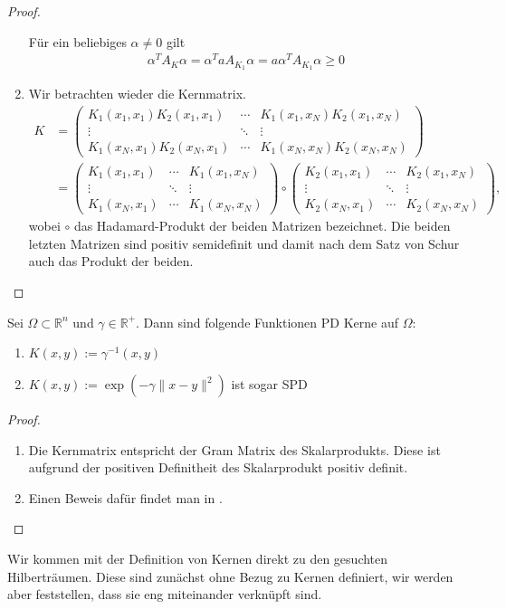 \begin{proof}
\begin{enumerate}
Für ein beliebiges $\alpha \neq 0$ gilt
\begin{align*}
\alpha^T A_K \alpha = \alpha^T a A_{K_1} \alpha = a \alpha^T A_{K_1} \alpha \geq 0
\end{align*}
\item
Wir betrachten wieder die Kernmatrix.
\begin{align*}
K &= 
\begin{pmatrix}
K_1(x_1,x_1)K_2(x_1, x_1) & \cdots & K_1(x_1,x_N)K_2(x_1, x_N) \\ 
\vdots & \ddots & \vdots \\ 
K_1(x_N,x_1)K_2(x_N, x_1) & \cdots & K_1(x_N,x_N)K_2(x_N, x_N)
\end{pmatrix} \\
&= 
\begin{pmatrix}
K_1(x_1,x_1) & \cdots & K_1(x_1,x_N) \\ 
\vdots & \ddots & \vdots \\ 
K_1(x_N,x_1) & \cdots & K_1(x_N,x_N)
\end{pmatrix}
\circ
\begin{pmatrix}
K_2(x_1, x_1) & \cdots & K_2(x_1, x_N) \\ 
\vdots & \ddots & \vdots \\ 
K_2(x_N, x_1) & \cdots & K_2(x_N, x_N)
\end{pmatrix},
\end{align*}
wobei $\circ$ das Hadamard-Produkt der beiden Matrizen bezeichnet. 
Die beiden letzten Matrizen sind positiv semidefinit und damit nach dem Satz von Schur \cite{.30.07.2018} auch das Produkt der beiden.
\end{enumerate}
\end{proof}

\begin{example}
\label{ex:Kern}
Sei $\Omega \subset \mathbb{R}^n$ und $\gamma \in \mathbb{R}^+$. Dann sind folgende Funktionen \ac{PD} Kerne auf $\Omega$:
\begin{enumerate}
\item $K(x,y) := \gamma^{-1} (x,y)$
\item $K(x,y) := \exp\left(-\gamma \|x-y\|^2\right)$ ist sogar \ac{SPD}
\end{enumerate}
\end{example}

\begin{proof}
$\mbox{}$
\begin{enumerate}
\item
Die Kernmatrix entspricht der Gram Matrix des Skalarprodukts. Diese ist aufgrund der positiven Definitheit des Skalarprodukt positiv definit. 
\item
Einen Beweis dafür findet man in \textcite[Theorem 6.10]{Wendland.2005}.
\end{enumerate}
\end{proof}
Wir kommen mit der Definition von Kernen direkt zu den gesuchten Hilberträumen. Diese sind zunächst ohne Bezug zu Kernen definiert, wir werden aber feststellen, dass sie eng miteinander verknüpft sind.

